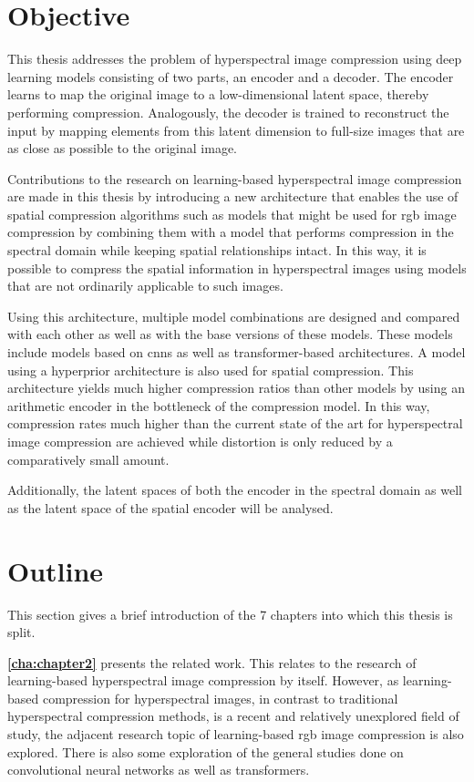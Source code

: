\section{Objective\label{sec:objective}}
This thesis addresses the problem of hyperspectral image compression using deep learning models consisting of two parts, an encoder and a decoder.
The encoder learns to map the original image to a low-dimensional latent space, thereby performing compression. Analogously, the decoder is trained to reconstruct the input by mapping elements from this latent dimension to full-size images that are as close as possible to the original image.

Contributions to the research on learning-based hyperspectral image compression are made in this thesis by introducing a new architecture that enables the use of spatial compression algorithms such as models that might be used for \ac{rgb} image compression by combining them with a model that performs compression in the spectral domain while keeping spatial relationships intact. In this way, it is possible to compress the spatial information in hyperspectral images using models that are not ordinarily applicable to such images.

Using this architecture, multiple model combinations are designed and compared with each other as well as with the base versions of these models.
These models include models based on \acp{cnn} as well as transformer-based architectures.
A model using a hyperprior architecture is also used for spatial compression. This architecture yields much higher compression ratios than other models by using an arithmetic encoder in the bottleneck of the compression model. In this way, compression rates much higher than the current state of the art for hyperspectral image compression are achieved while distortion is only reduced by a comparatively small amount. 

Additionally, the latent spaces of both the encoder in the spectral domain as well as the latent space of the spatial encoder will be analysed.

\section{Outline\label{sec:outline}}
This section gives a brief introduction of the 7 chapters into which this thesis is split.

\textbf{\autoref{cha:chapter2}} presents the related work. This relates to the research of learning-based hyperspectral image compression by itself. However, as learning-based compression for hyperspectral images, in contrast to traditional hyperspectral compression methods, is a recent and relatively unexplored field of study, the adjacent research topic of learning-based \ac{rgb} image compression is also explored. There is also some exploration of the general studies done on convolutional neural networks as well as transformers.

